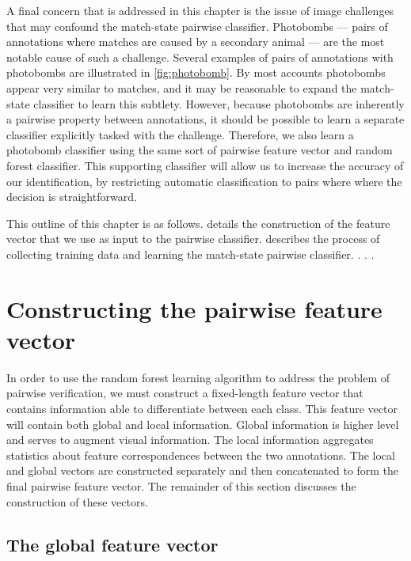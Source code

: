 A final concern that is addressed in this chapter is the issue of image
  challenges that may confound the match-state pairwise classifier.
Photobombs --- pairs of annotations where matches are caused by a secondary
  animal --- are the most notable cause of such a challenge.
Several examples of pairs of annotations with photobombs are illustrated in
  \cref{fig:photobomb}.
By most accounts photobombs appear very similar to matches, and it may be
  reasonable to expand the match-state classifier to learn this subtlety.
However, because photobombs are inherently a pairwise property between
  annotations, it should be possible to learn a separate classifier explicitly
  tasked with the challenge.
Therefore, we also learn a photobomb classifier using the same sort of
  pairwise feature vector and random forest classifier.
This supporting classifier will allow us to increase the accuracy of our
  identification, by restricting automatic classification to pairs where where
  the decision is straightforward.


This outline of this chapter is as follows.
 details the construction of the feature vector that we use
  as input to the pairwise classifier.
 describes the process of collecting training data and
  learning the match-state pairwise classifier.
 .
 .
 .


\section{Constructing the pairwise feature vector}\label{sec:pairfeat}

In order to use the random forest learning algorithm to address the problem of
  pairwise verification, we must construct a fixed-length feature vector that
  contains information able to differentiate between each class.
This feature vector will contain both global and local information.
Global information is higher level and serves to augment visual information.
The local information aggregates statistics about feature correspondences
  between the two annotations.
The local and global vectors are constructed separately and then concatenated
  to form the final pairwise feature vector.
The remainder of this section discusses the construction of these vectors.

\subsection{The global feature vector}

